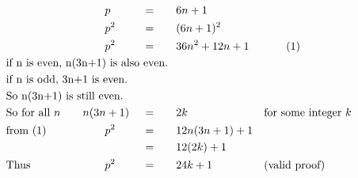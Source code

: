\begin{alignat*}{5}
&\,&&\qquad p&&\,=&&\quad6n+1\\
&\,&&\qquad p^2&&\,=&&\quad(6n+1)^2\\
&\,&&\qquad p^2&&\,=&&\quad36n^2+12n+1&&\qquad\text{(1)}\\
&\rlap{\text{if }n\text{ is even, }n(3n+1)\text{ is also even.}}\\
&\rlap{\text{if }n\text{ is odd, }3n+1\text{ is even.}}\\
&\rlap{\text{So }n(3n+1)\text{ is still even.}}\\
&\text{So for all }n\quad&&n(3n+1)&&\,=&&\quad2k&&\text{for some integer }k\\
&\text{from (1)}&&\qquad p^2&&\,=&&\quad 12n(3n+1)+1\\
&\,&&\,&&\,=&&\quad12(2k)+1\\
&\text{Thus}&&\qquad p^2&&\,=&&\quad24k+1&&\text{(valid proof)}
\end{alignat*}
